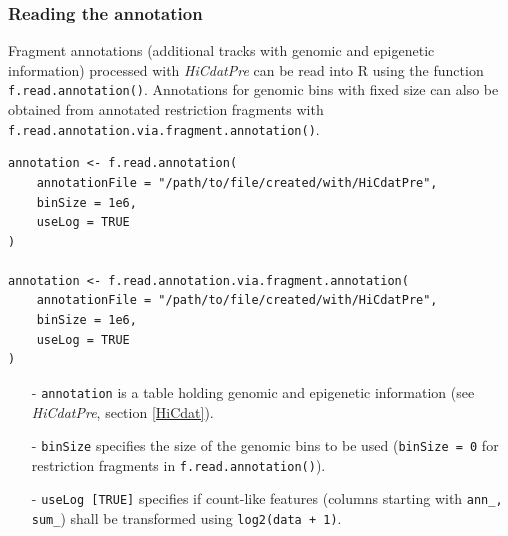 \documentclass[a4paper,10pt]{article}
\begin{document}
\subsubsection{Reading the annotation}\label{annotationLoading}
Fragment annotations (additional tracks with genomic and epigenetic information) processed with \textit{HiCdatPre} can be read into R using the function \texttt{f.read.annotation()}. Annotations for genomic bins with fixed size can also be obtained from annotated restriction fragments with \texttt{f.read.annotation.via.fragment.annotation()}.
\begin{verbatim}
annotation <- f.read.annotation(
    annotationFile = "/path/to/file/created/with/HiCdatPre", 
    binSize = 1e6, 
    useLog = TRUE
)

annotation <- f.read.annotation.via.fragment.annotation(
    annotationFile = "/path/to/file/created/with/HiCdatPre", 
    binSize = 1e6, 
    useLog = TRUE
)
\end{verbatim}
\begin{itemize}
 \item[-] \texttt{annotation} is a table holding genomic and epigenetic information (see \textit{HiCdatPre}, section \ref{HiCdat}).
 \item[-] \texttt{binSize} specifies the size of the genomic bins to be used (\texttt{binSize = 0} for restriction fragments in \texttt{f.read.annotation()}).
 \item[-] \texttt{useLog [TRUE]} specifies if count-like features (columns starting with \texttt{ann\_, sum\_}) shall be transformed using \texttt{log2(data + 1)}.
\end{itemize}
\clearpage
\end{document}
